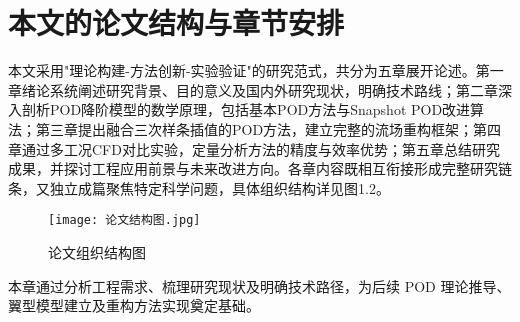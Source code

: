 \section{本文的论文结构与章节安排}
本文采用"理论构建-方法创新-实验验证"的研究范式，共分为五章展开论述。第一章绪论系统阐述研究背景、目的意义及国内外研究现状，明确技术路线；第二章深入剖析POD降阶模型的数学原理，包括基本POD方法与Snapshot POD改进算法；第三章提出融合三次样条插值的POD方法，建立完整的流场重构框架；第四章通过多工况CFD对比实验，定量分析方法的精度与效率优势；第五章总结研究成果，并探讨工程应用前景与未来改进方向。各章内容既相互衔接形成完整研究链条，又独立成篇聚焦特定科学问题，具体组织结构详见图1.2。
\begin{figure}[H]
    \centering
    \texttt{[image: 论文结构图.jpg]}
    \caption{论文组织结构图}
    \label{fig:enter-label}
\end{figure}
本章通过分析工程需求、梳理研究现状及明确技术路径，为后续 POD 理论推导、翼型模型建立及重构方法实现奠定基础。